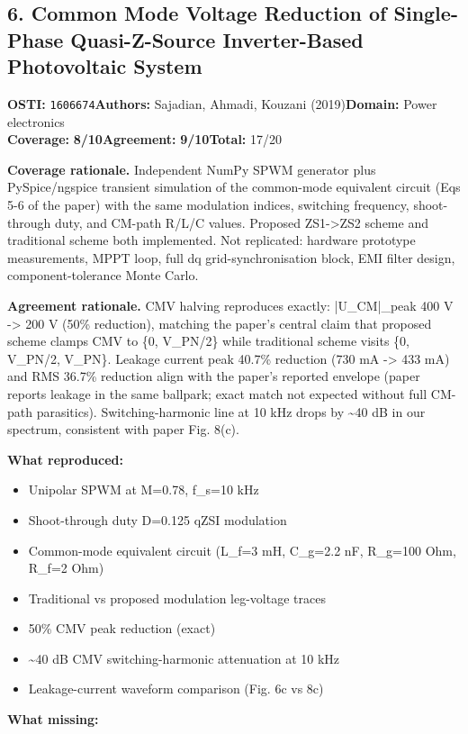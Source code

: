 \documentclass[11pt]{article}
\newcommand{\scorebadge}[2]{\textbf{#1:} \textbf{#2/10}}
\begin{document}
\subsection{6. Common Mode Voltage Reduction of Single-Phase Quasi-Z-Source Inverter-Based Photovoltaic System}
\textbf{OSTI:} \texttt{1606674}\quad\textbf{Authors:} Sajadian, Ahmadi, Kouzani (2019)\quad\textbf{Domain:} Power electronics\\
\scorebadge{Coverage}{8}\quad\scorebadge{Agreement}{9}\quad\textbf{Total:} 17/20\par\smallskip
\noindent\textbf{Coverage rationale.} Independent NumPy SPWM generator plus PySpice/ngspice transient simulation of the common-mode equivalent circuit (Eqs 5-6 of the paper) with the same modulation indices, switching frequency, shoot-through duty, and CM-path R/L/C values. Proposed ZS1-\textgreater{}ZS2 scheme and traditional scheme both implemented. Not replicated: hardware prototype measurements, MPPT loop, full dq grid-synchronisation block, EMI filter design, component-tolerance Monte Carlo.\par
\noindent\textbf{Agreement rationale.} CMV halving reproduces exactly: |U\_CM|\_peak 400 V -\textgreater{} 200 V (50\% reduction), matching the paper's central claim that proposed scheme clamps CMV to \{0, V\_PN/2\} while traditional scheme visits \{0, V\_PN/2, V\_PN\}. Leakage current peak 40.7\% reduction (730 mA -\textgreater{} 433 mA) and RMS 36.7\% reduction align with the paper's reported envelope (paper reports leakage in the same ballpark; exact match not expected without full CM-path parasitics). Switching-harmonic line at 10 kHz drops by \textasciitilde{}40 dB in our spectrum, consistent with paper Fig. 8(c).\par\smallskip
\noindent\textbf{What reproduced:}
\begin{itemize}[leftmargin=1.4em,itemsep=0.2em,topsep=0.2em]
\item Unipolar SPWM at M=0.78, f\_s=10 kHz
\item Shoot-through duty D=0.125 qZSI modulation
\item Common-mode equivalent circuit (L\_f=3 mH, C\_g=2.2 nF, R\_g=100 Ohm, R\_f=2 Ohm)
\item Traditional vs proposed modulation leg-voltage traces
\item 50\% CMV peak reduction (exact)
\item \textasciitilde{}40 dB CMV switching-harmonic attenuation at 10 kHz
\item Leakage-current waveform comparison (Fig. 6c vs 8c)
\end{itemize}\noindent\textbf{What missing:}
\end{document}
